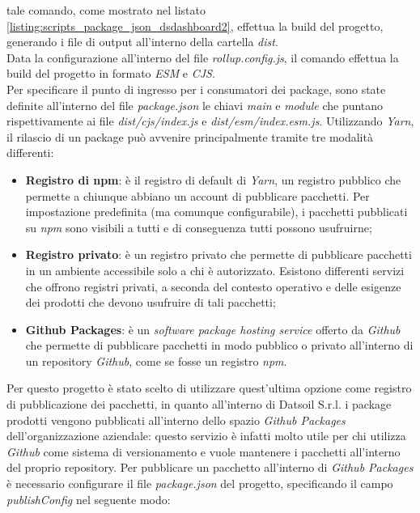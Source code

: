 tale comando, come mostrato nel listato \ref{listing:scripts_package_json_dsdashboard2}, effettua la build del progetto, generando i file di output all'interno della cartella \textit{dist}.\\
Data la configurazione all'interno del file \textit{rollup.config.js}, il comando effettua la build del progetto in formato \textit{ESM} e \textit{CJS}.\\
Per specificare il punto di ingresso per i consumatori dei package, sono state definite all'interno del file \textit{package.json} le chiavi \textit{main} e \textit{module} che puntano
rispettivamente ai file \textit{dist/cjs/index.js} e \textit{dist/esm/index.esm.js}.
Utilizzando \textit{Yarn}, il rilascio di un package può avvenire principalmente tramite tre modalità differenti:
\begin{itemize}
    \item \textbf{Registro di npm}: è il registro di default di \textit{Yarn}, un registro pubblico che permette a chiunque abbiano
          un account di pubblicare pacchetti. Per impostazione predefinita (ma comunque configurabile), i pacchetti pubblicati su \textit{npm}
          sono visibili a tutti e di conseguenza tutti possono usufruirne;
    \item \textbf{Registro privato}: è un registro privato che permette di pubblicare pacchetti in un ambiente accessibile solo a chi è
          autorizzato. Esistono differenti servizi che offrono registri privati, a seconda del contesto operativo e delle esigenze dei prodotti
          che devono usufruire di tali pacchetti;
    \item \textbf{Github Packages}: è un \textit{software package hosting service} offerto da \textit{Github} che permette di pubblicare pacchetti
          in modo pubblico o privato all'interno di un repository \textit{Github}, come se fosse un registro \textit{npm}.
\end{itemize}
Per questo progetto è stato scelto di utilizzare quest'ultima opzione come registro di pubblicazione dei pacchetti, in quanto
all'interno di Datsoil S.r.l. i package prodotti vengono pubblicati all'interno dello spazio \textit{Github Packages} dell'organizzazione aziendale:
questo servizio è infatti molto utile per chi utilizza \textit{Github} come sistema di versionamento e vuole mantenere i pacchetti all'interno del proprio repository.
Per pubblicare un pacchetto all'interno di \textit{Github Packages} è necessario configurare il file \textit{package.json} del progetto, specificando
il campo \textit{publishConfig} nel seguente modo:

